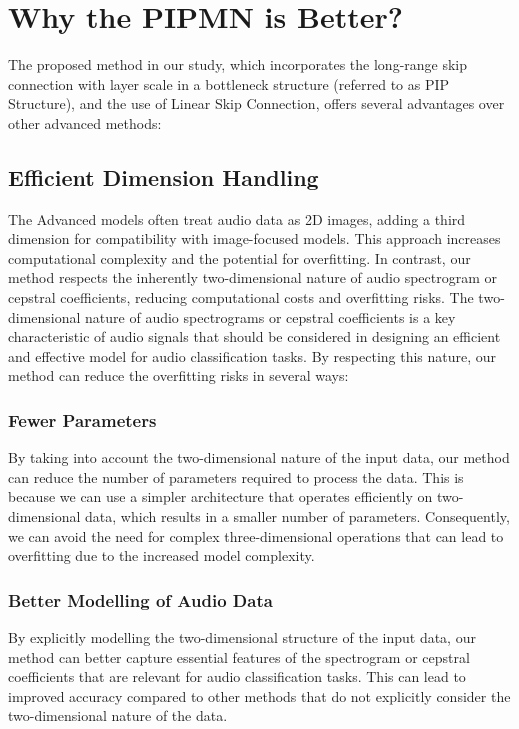 \documentclass[runningheads]{llncs}
\begin{document}
\section{Why the PIPMN is Better?}
The proposed method in our study, which incorporates the long-range skip connection with layer scale in a bottleneck structure (referred to as PIP Structure), and the use of Linear Skip Connection, offers several advantages over other advanced methods:

\subsection{Efficient Dimension Handling} The Advanced models often treat audio data as 2D images, adding a third dimension for compatibility with image-focused models. This approach increases computational complexity and the potential for overfitting. In contrast, our method respects the inherently two-dimensional nature of audio spectrogram or cepstral coefficients, reducing computational costs and overfitting risks. The two-dimensional nature of audio spectrograms or cepstral coefficients is a key characteristic of audio signals that should be considered in designing an efficient and effective model for audio classification tasks. By respecting this nature, our method can reduce the overfitting risks in several ways:
\subsubsection{Fewer Parameters} By taking into account the two-dimensional nature of the input data, our method can reduce the number of parameters required to process the data. This is because we can use a simpler architecture that operates efficiently on two-dimensional data, which results in a smaller number of parameters. Consequently, we can avoid the need for complex three-dimensional operations that can lead to overfitting due to the increased model complexity.
\subsubsection{Better Modelling of Audio Data} By explicitly modelling the two-dimensional structure of the input data, our method can better capture essential features of the spectrogram or cepstral coefficients that are relevant for audio classification tasks. This can lead to improved accuracy compared to other methods that do not explicitly consider the two-dimensional nature of the data.
\end{document}
